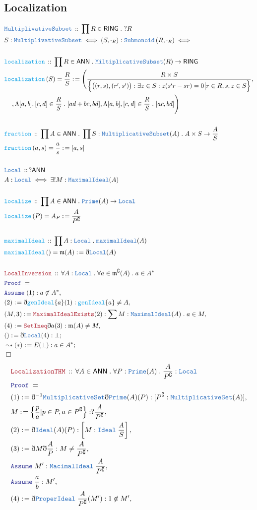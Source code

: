 \documentclass[12pt]{scrartcl}
\newcommand{\TYPE}[1]{\textcolor{NavyBlue}{\mathtt{#1}}}
\newcommand{\FUNC}[1]{\textcolor{Cerulean}{\mathtt{#1}}}
\newcommand{\LOGIC}[1]{\textcolor{Blue}{\mathtt{#1}}}
\newcommand{\THM}[1]{\textcolor{Maroon}{\mathtt{#1}}}
\renewcommand{\.}{\; . \;}
\newcommand{\de}{: \kern 0.1pc =}
\newcommand{\Act}[1]{\left( #1 \right)}
\newcommand{\Theorem}[2]{& \THM{#1} \, :: \, #2 \\ & \Proof = \\ }
\newcommand{\DeclareType}[2]{& \TYPE{#1} \, :: \, #2 \\}
\newcommand{\DefineType}[3]{& #1 : \TYPE{#2} \iff #3 \\}
\newcommand{\DefineNamedType}[4]{& #1 : \TYPE{#2} \iff #3 \iff #4 \\}
\newcommand{\DeclareFunc}[2]{& \FUNC{#1} \, :: \, #2 \\}
\newcommand{\DefineNamedFunc}[4]{&  \FUNC{#1}\Act{#2} = #3 \de #4 \\}
\newcommand{\NewLine}{\\ & \kern 1pc}
\newcommand{\Page}[1]{ \begin{align*} #1 \end{align*}   }
\newcommand{ \bd }{ \ByDef }
\renewcommand{\c}{\complement}
\newcommand{\Say}[3]{& #1 \de #2 : #3, \\}
\newcommand{\Conclude}[3]{& #1 \de #2 : #3; \\}
\newcommand{\DeriveConclude}[3]{& \leadsto #1 \de #2 : #3 ; \\}
\newcommand{\Assume}[2]{& \LOGIC{Assume} \; #1 : #2, \\}
\newcommand{\QED}{\; \square}
\newcommand{\EndProof}{& \QED \\}
\newcommand{\ByDef}{\eth}
\newcommand{\Proof}{\LOGIC{Proof} \; }
\newcommand{\Ideal}{\TYPE{Ideal}}
\newcommand{\RING}{\mathsf{RING}}
\newcommand{\ANN}{\mathsf{ANN}}
\begin{document}
\subsection{Localization}
\Page{
	\DeclareType{MultiplivativeSubset}{ \prod R \in \RING \. ?R  } 
	\DefineNamedType{S}{MultiplivativeSubset}{(S,\cdot_R) : \TYPE{Submonoid}\left( R, \cdot_R \right) }
	\\
	\DeclareFunc{localization}{\prod R \in \ANN \. \TYPE{MiltiplicativeSubset}(R) \to \RING }
	\DefineNamedFunc{localization}{ S  }{ \frac{R}{S} }{ \Bigg( \frac{R \times S}{\Big\{\big( (r,s),(r',s') \big) : 
		\exists z \in S : z(s'r - sr) = 0 \big| r \in R, s,z \in S    \Big\}}, \NewLine , 
		\Lambda [a,b],[c,d] \in \frac{R}{S} \. [ad + bc, bd], \Lambda [a,b],[c,d] \in \frac{R}{S} \.  [ac, bd]   \Bigg)       }
	\\
	\DeclareFunc{fraction}{\prod A \in \ANN \. \prod S : \TYPE{MultiplicativeSubset}(A) \. A \times S \to \frac{A}{S}}
	\DefineNamedFunc{fraction}{a,s}{\frac{a}{s}}{[a,s]}
	\\
	\DeclareType{Local}{?\ANN}
	\DefineType{A}{Local}{\exists! M : \TYPE{MaximalIdeal}(A) }
	\\
	\DeclareFunc{localize}{\prod A \in \ANN \. \TYPE{Prime}(A) \to \TYPE{Local} }
	\DefineNamedFunc{localize}{P}{A_P}{ \frac{A}{P^\c}  }
	\\
	\DeclareFunc{maximalIdeal}{\prod A : \TYPE{Local} \. \TYPE{maximalIdeal}(A)}
	\DefineNamedFunc{maximalIdeal}{}{\mathfrak{m}(A)}{\bd \TYPE{Local}(A)}
	\\
	\Theorem{LocalInversion}{\forall A : \TYPE{Local} \. \forall a \in \mathfrak{m}^\c(A) \. a \in A^*}
	\Assume{(1)}{a \not \in A^*}
	\Say{(2)}{\bd \FUNC{genIdeal}\{a\}(1)}{ \FUNC{genIdeal}\{a\} \neq A}
	\Say{(M,3)}{\THM{MaximalIdealExists}(2)}{\sum M : \TYPE{MaximalIdeal}(A) \. a  \in M}
	\Say{(4)}{\THM{SetIneq}\bd a(3)}{\mathrm{m}(A) \neq M}
	\Conclude{()}{\bd \TYPE{Local}(4)}{\bot}
	\DeriveConclude{(*)}{E(\bot)}{ a \in A^* }
	\EndProof
}\Page{
	\Theorem{LocalizationTHM}{\forall A \in \ANN \. \forall P : \TYPE{Prime}(A) \. \frac{A}{P^\c} : \TYPE{Local} }
	\Say{(1)}{\bd^{-1} \TYPE{MultiplicativeSet} \bd \TYPE{Prime}(A)(P) }{[P^\c : \TYPE{MultiplicativeSet}(A)]}
	\Say{M}{\left\{\frac{p}{a}|p\in P,a \in P^\c \right\}}{?\frac{A}{P^\c}}
	\Say{(2)}{\bd \Ideal(A)(P)}{\left[M : \TYPE{Ideal} \; \frac{A}{S}\right]}
	\Say{(3)}{\bd M \bd \frac{A}{P}}{M \neq \frac{A}{P^\c}}
	\Assume{M'}{\TYPE{MacimalIdeal}\; \frac{A}{P^\c}}
	\Assume{\frac{a}{b}}{M'}
	\Say{(4)}{\bd \TYPE{ProperIdeal} \; \frac{A}{P^\c}(M')}{1 \not \in M' }
}
\end{document}

